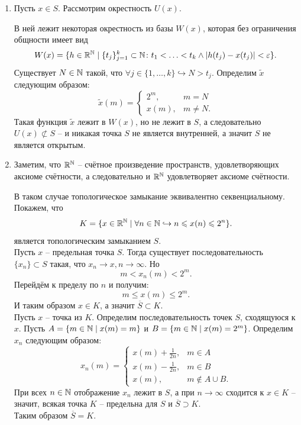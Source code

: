 \begin{solve}
    \begin{enumerate}
        \item Пусть $x \in S$. Рассмотрим окрестность $U(x)$.

        В ней лежит некоторая окрестность из базы $W(x)$, которая без ограничения общности имеет вид
        \[
            W(x) = \{h \in \mathbb{R}^{\mathbb{N}} \mid \{t_j\}_{j = 1}^k \subset \mathbb{N} \colon t_1 < \ldots < t_k \wedge |h(t_j) - x(t_j)| < \varepsilon\}.
        \]
        Существует $N \in \mathbb{N}$ такой, что $\forall j \in \{1, \ldots, k\} \hookrightarrow N > t_j$. Определим $\tilde{x}$ следующим образом:
        \[
            \tilde{x}(m) = \begin{cases}
                               2^m, & m = N \\
                               x(m), & m \neq N.
            \end{cases}
        \]
        Такая функция $\tilde{x}$ лежит в $W(x)$, но не лежит в $S$, а следовательно $U(x) \not\subset S$ -- и никакая точка $S$ не является внутренней, а значит $S$ не является открытым.
        \item Заметим, что $\mathbb{R}^{\mathbb{N}}$ -- счётное произведение пространств, удовлетворяющих аксиоме счётности, а следовательно и $\mathbb{R}^{\mathbb{N}}$ удовлетворяет аксиоме счётности.

        В таком случае топологическое замыкание эквивалентно секвенциальному. Покажем, что
        \[
            K = \{x \in \mathbb{R}^{\mathbb{N}} \mid \forall n \in \mathbb{N} \hookrightarrow n \leqslant x(n) \leqslant 2^n\}.
        \]
        является топологическим замыканием $S$. \\
        Пусть $x$ -- предельная точка $S$. Тогда существует последовательность $\{x_n\} \subset S$ такая, что $x_n \rightarrow x, n \rightarrow \infty$. Но
        \[
            m < x_n(m) < 2^m.
        \]
        Перейдём к пределу по $n$ и получим:
        \[
            m \leq x(m) \leq 2^m.
        \]
        И таким образом $x \in K$, а значит $\overline{S} \subset K$. \\
        Пусть $x$ -- точка из $K$. Определим последовательность точек $S$, сходящуюся к $x$. Пусть $A = \{m \in \mathbb{N} \mid x(m) = m\}$ и $B = \{m \in \mathbb{N} \mid x(m) = 2^m\}$.
        Определим $x_n$ следующим образом:
        \[
            x_n(m) = \begin{cases}
                         x(m) + \frac{1}{2n}, & m \in A \\
                         x(m) - \frac{1}{2n}, & m \in B \\
                         x(m), & m \notin A \cup B.
            \end{cases}
        \]
        При всех $n \in \mathbb{N}$ отображение $x_n$ лежит в $S$, а при $n \rightarrow \infty$ сходится к $x \in K$ -- значит, всякая точка $K$ -- предельна для $S$ и $\overline{S} \supset K$. \\
        Таким образом $\overline{S} = K$.
    \end{enumerate}
\end{solve}
